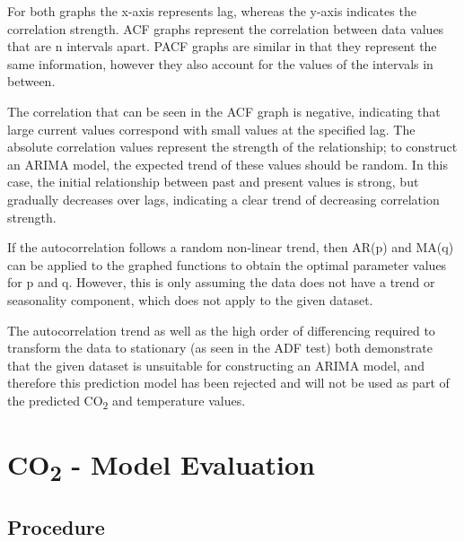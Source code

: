 \documentclass[12pt]{mcmthesis}
\begin{document}
    For both graphs the x-axis represents lag, whereas the y-axis indicates the correlation strength. ACF graphs represent the correlation between data values that are n intervals apart. PACF graphs are similar in that they represent the same information, however they also account for the values of the intervals in between.

    The correlation that can be seen in the ACF graph is negative, indicating that large current values correspond with small values at the specified lag. The absolute correlation values represent the strength of the relationship; to construct an ARIMA model, the expected trend of these values should be random. In this case, the initial relationship between past and present values is strong, but gradually decreases over lags, indicating a clear trend of decreasing correlation strength.

    If the autocorrelation follows a random non-linear trend, then AR(p) and MA(q) can be applied to the graphed functions to obtain the optimal parameter values for p and q.
    However, this is only assuming the data does not have a trend or seasonality component, which does not apply to the given dataset.

    The autocorrelation trend as well as the high order of differencing required to transform the data to stationary (as seen in the ADF test) both demonstrate that the given dataset is unsuitable for constructing an ARIMA model, and therefore this prediction model has been rejected and will not be used as part of the predicted CO\textsubscript{2} and temperature values.



    \section{CO\textsubscript{2} - Model Evaluation}

    \subsection{Procedure}
\end{document}
